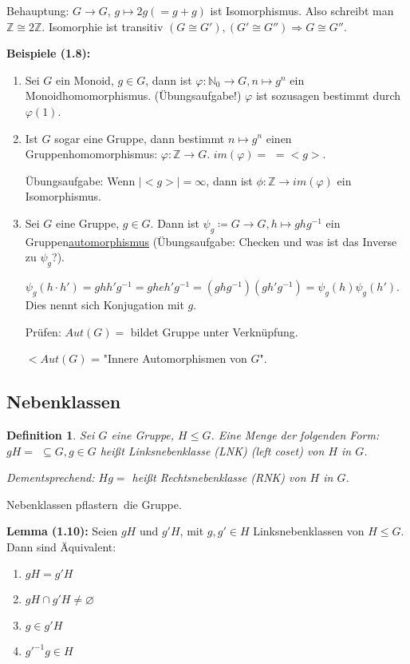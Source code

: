 \documentclass[10pt,a4paper]{article}
\newtheorem{defi}{Definition}
\begin{document}
Behauptung: $G \to G$, $g \mapsto 2g (= g + g)$ ist Isomorphismus. Also schreibt man $\mathbb{Z} \cong 2\mathbb{Z}$. Isomorphie ist transitiv $(G \cong G'), (G' \cong G'') \Rightarrow G \cong G''$.\bigskip

\textbf{Beispiele (1.8):}
\begin{enumerate}
\item Sei $G$ ein Monoid, $g \in G$, dann ist $\varphi : \mathbb{N}_0 \to G, n \mapsto g^n$ ein Monoidhomomorphismus. (Übungsaufgabe!) $\varphi$ ist sozusagen bestimmt durch $\varphi(1)$. 

\item Ist $G$ sogar eine Gruppe, dann bestimmt $n \mapsto g^n$ einen Gruppenhomomorphismus: $\varphi : \mathbb{Z} \to G$. $im(\varphi) = $  $= < g >$.

Übungsaufgabe: Wenn $\vert <g> \vert = \infty$, dann ist $\phi : \mathbb{Z} \to im(\varphi)$ ein Isomorphismus.

\item Sei $G$ eine Gruppe, $g \in G$. Dann ist $\psi_g \coloneqq G \to G, h \mapsto g h g^{-1}$ ein Gruppen\underline{automorphismus} (Übungsaufgabe: Checken und was ist das Inverse zu $\psi_g$?).

$\psi_g(h \cdot h') = g h h' g^{-1} = gheh'g^{-1} = (ghg^{-1})(gh'g^{-1}) = \psi_g(h) \psi_g(h')$. Dies nennt sich \glqq Konjugation mit $g$\grqq .

Prüfen: $Aut(G) =$  bildet Gruppe unter Verknüpfung.

 $< Aut(G)$ = "Innere Automorphismen von $G$".
\end{enumerate}

\subsection{Nebenklassen}

\begin{defi}
Sei $G$ eine Gruppe, $H \leqslant G$. Eine Menge der folgenden Form: $gH = $  $\subseteq G, g \in G$ heißt \emph{Linksnebenklasse} (LNK) (left coset) von $H$ in $G$.

Dementsprechend: $Hg = $  heißt Rechtsnebenklasse (RNK) von $H$ in $G$.
\end{defi}

Nebenklassen \glqq pflastern\grqq\ die Gruppe.

\textbf{Lemma (1.10):} Seien $gH$ und $g'H$, mit $g, g' \in H$ Linksnebenklassen von $H \leqslant G$. Dann sind Äquivalent:
\begin{enumerate}
\item $gH = g'H$
\item $gH \cap g'H \neq \varnothing$
\item $g \in g'H$
\item $g'^{-1} g \in H$
\end{enumerate}
\end{document}
